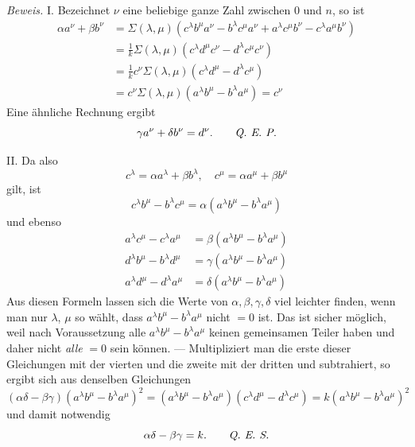 \textit{Beweis.} I. Bezeichnet $\nu$ eine beliebige ganze Zahl zwischen $0$ und $n$, so ist
\[
\begin{aligned}
\alpha a^\nu+\beta b^\nu
&=\Sigma(\lambda,\mu)(c^\lambda b^\mu a^\nu-b^\lambda c^\mu a^\nu+a^\lambda c^\mu b^\nu-c^\lambda a^\mu b^\nu)\\
&=\frac1k\Sigma(\lambda,\mu)(c^\lambda d^\mu c^\nu-d^\lambda c^\mu c^\nu)\\
&=\frac1k c^\nu\Sigma(\lambda,\mu)(c^\lambda d^\mu-d^\lambda c^\mu)\\
&=c^\nu\Sigma(\lambda,\mu)(a^\lambda b^\mu-b^\lambda a^\mu)=c^\nu
\end{aligned}
\]
Eine ähnliche Rechnung ergibt
\[
\gamma a^\nu+\delta b^\nu=d^\nu.\qquad\text{\textit{Q. E. P.}}
\]

II. Da also
\[
c^\lambda=\alpha a^\lambda+\beta b^\lambda,\quad c^\mu=\alpha a^\mu+\beta b^\mu
\]
gilt, ist
\[
c^\lambda b^\mu-b^\lambda c^\mu=\alpha(a^\lambda b^\mu-b^\lambda a^\mu)
\]
und ebenso
\[
\begin{aligned}
a^\lambda c^\mu-c^\lambda a^\mu&=\beta(a^\lambda b^\mu-b^\lambda a^\mu)\\
d^\lambda b^\mu-b^\lambda d^\mu&=\gamma(a^\lambda b^\mu-b^\lambda a^\mu)\\
a^\lambda d^\mu-d^\lambda a^\mu&=\delta(a^\lambda b^\mu-b^\lambda a^\mu)
\end{aligned}
\]
Aus diesen Formeln lassen sich die Werte von $\alpha,\beta,\gamma,\delta$ viel leichter finden, wenn man nur $\lambda$, $\mu$ so wählt, dass $a^\lambda b^\mu-b^\lambda a^\mu$ nicht $=0$ ist. Das ist sicher möglich, weil nach Voraussetzung alle $a^\lambda b^\mu-b^\lambda a^\mu$ keinen gemeinsamen Teiler haben und daher nicht \textit{alle} $=0$ sein können. --- Multipliziert man die erste dieser Gleichungen mit der vierten und die zweite mit der dritten und subtrahiert, so ergibt sich aus denselben Gleichungen
\[
(\alpha\delta-\beta\gamma)(a^\lambda b^\mu-b^\lambda a^\mu)^2
=(a^\lambda b^\mu-b^\lambda a^\mu)(c^\lambda d^\mu-d^\lambda c^\mu)
=k(a^\lambda b^\mu-b^\lambda a^\mu)^2
\]
und damit notwendig
\[
\alpha\delta-\beta\gamma=k.\qquad\text{\textit{Q. E. S.}}
\]

